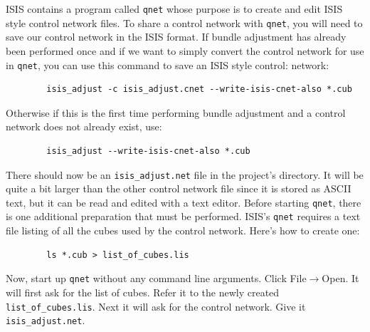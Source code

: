 ISIS contains a program called \texttt{qnet} whose purpose is to
create and edit ISIS style control network files. To share a control
network with \texttt{qnet}, you will need to save our control network
in the ISIS format. If bundle adjustment has already been performed
once and if we want to simply convert the control network for use in
\texttt{qnet}, you can use this command to save an ISIS style control:
network:

\begin{verbatim}
        isis_adjust -c isis_adjust.cnet --write-isis-cnet-also *.cub
\end{verbatim}

Otherwise if this is the first time performing bundle adjustment and a
control network does not already exist, use:

\begin{verbatim}
        isis_adjust --write-isis-cnet-also *.cub
\end{verbatim}

There should now be an \verb=isis_adjust.net= file in the project's
directory. It will be quite a bit larger than the other control
network file since it is stored as ASCII text, but it can be read and
edited with a text editor. Before starting \texttt{qnet}, there is one
additional preparation that must be performed. ISIS's \texttt{qnet} requires
a text file listing of all the cubes used by the control
network. Here's how to create one:

\begin{verbatim}
        ls *.cub > list_of_cubes.lis
\end{verbatim}

Now, start up \texttt{qnet} without any command line arguments. Click
File$\rightarrow$Open. It will first ask for the list of cubes. Refer
it to the newly created \texttt{list\_of\_cubes.lis}. Next it will ask for
the control network. Give it \texttt{isis\_adjust.net}.

\begin{center}
\end{center}

